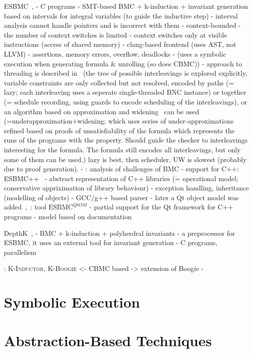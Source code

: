 ESBMC~\cite{Gadelha2019}, \cite{Gadelha2018}
- C programs
- SMT-based BMC + k-induction + invariant generation based on intervals for integral variables (to guide the inductive step)
- interval analysis cannot handle pointers and is incorrect with them
- context-bounded - the number of context switches is limited
- context switches only at visible instructions (access of shared memory)
- clang-based frontend (uses AST, not LLVM)
- assertions, memory errors, overflow, deadlocks
- (uses a symbolic execution when generating formula \& unrolling (so does CBMC))
- approach to threading is described in~\cite{Cordeiro2011} (the tree of possible interleavings is explored explicitly, variable constraints are only collected but not resolved, encoded by paths (= lazy; each interleaving uses a seperate single-threaded BNC instance) or together (= schedule recording, using guards to encode scheduling of the interleavings), or an algorithm based on approximation and widening~\cite{Grumberg2005} can be used (=underapproximation+widening; which uses series of under-approximations refined based on proofs of unsatisfiability of the formula which represents the runs of the programs with the property. Should guide the checker to interleavings interesting for the formula. The formula still encodes all interleavings, but only some of them can be used.) lazy is best, then scheduler, UW is slowest (probably due to proof generation).
- \cite{Cordeiro2016}: analysis of challenges of BMC
- support for C++: ESBMC++~\cite{Ramalho2013}
  - abstract representation of C++ libraries (= operational model; conservative appriximation of library behaviour)
  - exception handling, inheritance (modelling of objects)
  - GCC/g++ based parser
  - later a Qt object model was added~\cite{Sousa2015},~\cite{Garcia2016}: tool $\text{ESBMC}^{\mathit{Qt}OM}$
    - partial support for the Qt framework for C++ programs
    - model based on documentation


DepthK~\cite{Rocha2017}, \cite{Rocha2017svc}
- BMC + k-induction + polyherdral invariants
- a preprocessor for ESBMC, it uses an external tool for invariant generation
- C programs, parallelism

\cite{Donaldson2011}: \textsc{K-Inductor}, \textsc{K-Boogie}
<- CBMC based
-> extension of Boogie
- 


\section{Symbolic Execution}

\section{Abstraction-Based Techniques}


